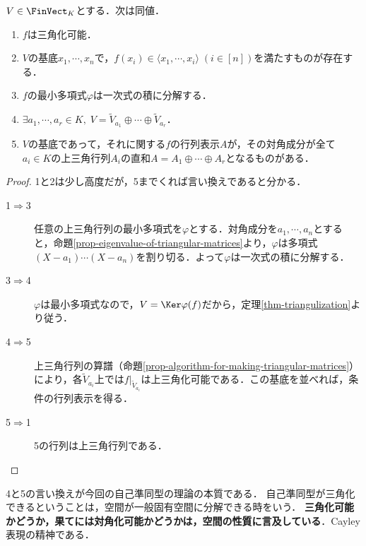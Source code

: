 \documentclass[uplatex, dvipdfmx]{jsreport}
\begin{document}
\begin{corollary}[三角化可能条件]\label{cor-triangulability}
    $V\in\FinVect_K$とする．次は同値．
    \begin{enumerate}
        \item $f$は三角化可能．
        \item $V$の基底$x_1,\cdots,x_n$で，$f(x_i)\in\langle x_1,\cdots,x_i\rangle\;(i\in[n])$を満たすものが存在する．
        \item $f$の最小多項式$\varphi$は一次式の積に分解する．
        \item $\exists a_1,\cdots,a_r\in K,\;V=\widetilde{V}_{a_1}\oplus\cdots\oplus\widetilde{V}_{a_r}$．
        \item $V$の基底であって，それに関する$f$の行列表示$A$が，その対角成分が全て$a_i\in K$の上三角行列$A_i$の直和$A=A_1\oplus\cdots\oplus A_r$となるものがある．
    \end{enumerate}
\end{corollary}
\begin{proof}
    1と2は少し高度だが，5までくれば言い換えであると分かる．
    \begin{description}
        \item[1$\Rightarrow$3] 任意の上三角行列の最小多項式を$\varphi$とする．対角成分を$a_1,\cdots,a_n$とすると，命題\ref{prop-eigenvalue-of-triangular-matrices}より，$\varphi$は多項式$(X-a_1)\cdots(X-a_n)$を割り切る．よって$\varphi$は一次式の積に分解する．
        \item[3$\Rightarrow$4] $\varphi$は最小多項式なので，$V=\Ker\varphi(f)$だから，定理\ref{thm-triangulization}より従う．
        \item[4$\Rightarrow$5] 上三角行列の算譜（命題\ref{prop-algorithm-for-making-triangular-matrices}）により，各$\tilde{V}_{a_i}$上では$f|_{\tilde{V}_{a_i}}$は上三角化可能である．この基底を並べれば，条件の行列表示を得る．
        
        \item[5$\Rightarrow$1] 5の行列は上三角行列である．
    \end{description}
\end{proof}
\begin{remark}
    4と5の言い換えが今回の自己準同型の理論の本質である．
    自己準同型が三角化できるということは，空間が一般固有空間に分解できる時をいう．
    \textbf{三角化可能かどうか，果てには対角化可能かどうかは，空間の性質に言及している}．Cayley表現の精神である．
\end{remark}
\end{document}

